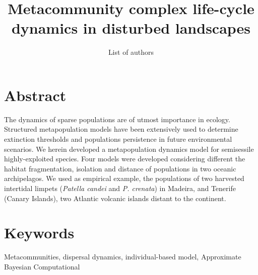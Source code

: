 \documentclass[12pt]{article}
\date{}
\begin{document}
\title{Metacommunity complex life-cycle dynamics in disturbed landscapes}
\author{List of authors}


\maketitle

\section{Abstract}
The dynamics of sparse populations are of utmost importance in
ecology. Structured metapopulation models have been extensively used
to determine extinction thresholds and populations persistence in
future environmental scenarios. We herein developed a metapopulation
dynamics model for semisessile highly-exploited species. Four models
were developed considering different the habitat fragmentation,
isolation and distance of populations in two oceanic archipelagos. We
used as empirical example, the populations of two harvested intertidal
limpets (\textit{Patella candei} and \textit{P. crenata}) in Madeira,
and Tenerife (Canary Islands), two Atlantic volcanic islands distant
to the continent.

\section{Keywords}
Metacommunities, dispersal dynamics, individual-based model, Approximate Bayesian Computational
\end{document}
